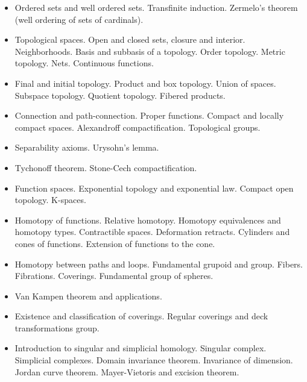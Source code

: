 \documentclass[spanish]{article}
\begin{document}
\begin{itemize}
  \item
Ordered sets and well ordered sets. Transfinite induction. Zermelo's theorem (well
ordering of sets of cardinals).

  \item
Topological spaces. Open and closed sets, closure and interior. Neighborhoods.
Basis and subbasis of a topology. Order topology. Metric topology. Nets.
Continuous functions.

  \item
Final and initial topology. Product and box topology. Union of spaces. Subspace
topology. Quotient topology. Fibered products.

  \item
Connection and path-connection. Proper functions. Compact and locally compact
spaces. Alexandroff compactification. Topological groups.

  \item
Separability axioms. Urysohn's lemma.

  \item
Tychonoff theorem. Stone-Cech compactification.

  \item
Function spaces. Exponential topology and exponential law.
Compact open topology. K-spaces.


  \item
Homotopy of functions. Relative homotopy. Homotopy equivalences and homotopy
types. Contractible spaces. Deformation retracts. Cylinders and cones of functions.
Extension of functions to the cone.

  \item
Homotopy between paths and loops. Fundamental grupoid and group. Fibers.
Fibrations. Coverings. Fundamental group of spheres.

  \item
Van Kampen theorem and applications.

  \item
Existence and classification of coverings. Regular coverings and deck transformations
group.

  \item
Introduction to singular and simplicial homology. Singular complex. Simplicial
complexes. Domain invariance theorem. Invariance of dimension. Jordan curve theorem.
Mayer-Vietoris and excision theorem.
\end{itemize}
\end{document}
